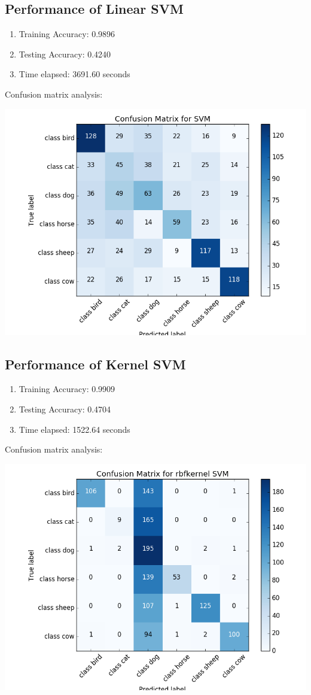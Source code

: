 \documentclass{article}
\begin{document}
\subsection{Performance of Linear SVM}
\begin{enumerate}
\item Training Accuracy: 0.9896
\item Testing Accuracy: 0.4240
\item Time elapsed: 3691.60 seconds
\end{enumerate}
Confusion matrix analysis: 
\begin{center}
\includegraphics[scale=0.4]{svm_cm_new.png}
\end{center}

\subsection{Performance of Kernel SVM}
\begin{enumerate}
\item Training Accuracy: 0.9909
\item Testing Accuracy: 0.4704
\item Time elapsed: 1522.64 seconds
\end{enumerate}
Confusion matrix analysis: \begin{center}
\includegraphics[scale=0.4]{kernelSVM_cm_new.png}
\end{center}
\end{document}
